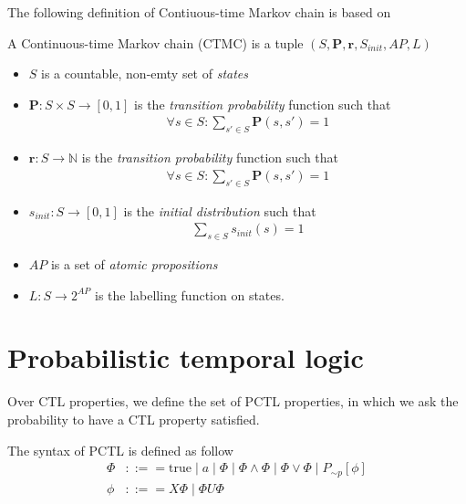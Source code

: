 The following definition of Contiuous-time Markov chain is based on \cite{baier2003model}
\begin{definition}
    A Continuous-time Markov chain (CTMC) is a tuple $(S,\mathbf{P}, \mathbf{r}, S_{init}, AP, L)$
    \cite{baier2003model}
    \begin{itemize}
        \item $S$ is a countable, non-emty set of \textit{states}
        \item $\mathbf{P}:S\times S \rightarrow [0,1]$ is the \textit{transition probability}
              function such that
              \begin{align*}
                  \forall s \in S : \sum_{s'\in S}\mathbf{P}(s, s') = 1
              \end{align*}
        \item $\mathbf{r}:S \rightarrow \mathbb{N}$ is the \textit{transition probability} function
              such that
              \begin{align*}
                  \forall s \in S : \sum_{s'\in S}\mathbf{P}(s, s') = 1
              \end{align*}
        \item $s_{init}: S \rightarrow [0,1]$ is the \textit{initial distribution} such that
              \begin{align*}
                  \sum_{s\in S}s_{init}(s) = 1
              \end{align*}
        \item $AP$ is a set of \textit{atomic propositions}
        \item $L: S \rightarrow 2^{AP}$ is the labelling function on states.
    \end{itemize}
\end{definition}




\section{Probabilistic temporal logic}
Over CTL properties, we define the set of PCTL properties, in which we ask the probability to have a
CTL property satisfied.
\begin{definition} The syntax of PCTL is defined as follow
    \begin{align*}
        \Phi & ::== \text{true} \;|\; a \;|\; \Phi \;|\; \Phi \wedge \Phi \;|\; \Phi \vee \Phi \;|\;  P_{\sim  p}[\phi] \\
        \phi & ::== X\Phi \;|\; \Phi U \Phi
    \end{align*}
\end{definition}

